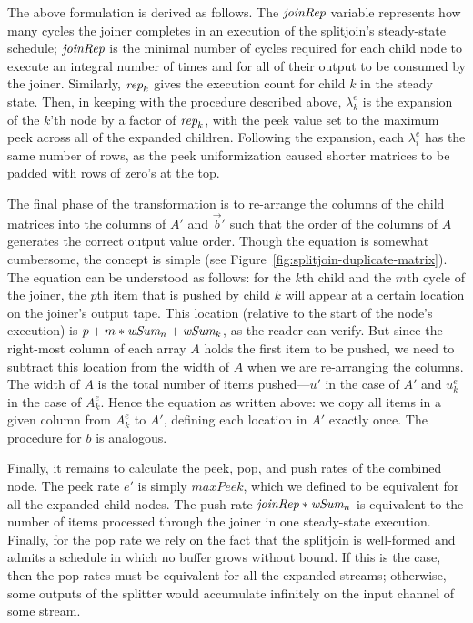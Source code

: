 {The above formulation is derived as follows.  The $\mbox{\it joinRep}$
variable represents how many cycles the joiner completes in an
execution of the splitjoin's steady-state schedule; $\mbox{\it joinRep}$ is
the minimal number of cycles required for each child node to execute
an integral number of times and for all of their output to be consumed
by the joiner.  Similarly, $\mbox{\it rep}_k$ gives the execution count for
child $k$ in the steady state.  Then, in keeping with the procedure
described above, $\lambda_k^e$ is the expansion of the $k$'th node by
a factor of $\mbox{\it rep}_k$, with the peek value set to the maximum peek
across all of the expanded children.  Following the expansion, each
$\lambda_i^e$ has the same number of rows, as the peek uniformization
caused shorter matrices to be padded with rows of zero's at the top.

The final phase of the transformation is to re-arrange the columns of
the child matrices into the columns of $A'$ and $\vec{b}'$ such that
the order of the columns of $A$ generates the correct output value
order.  Though the equation is somewhat cumbersome, the concept is
simple (see Figure~\ref{fig:splitjoin-duplicate-matrix}).  The
equation can be understood as follows: for the $k$th child and the
$m$th cycle of the joiner, the $p$th item that is pushed by child $k$
will appear at a certain location on the joiner's output tape.  This
location (relative to the start of the node's execution) is $p + m *
\mbox{\it wSum}_n + \mbox{\it wSum}_k$, as the reader can verify.  But since the
right-most column of each array $A$ holds the first item to be pushed,
we need to subtract this location from the width of $A$ when we are
re-arranging the columns.  The width of $A$ is the total number of
items pushed---$u'$ in the case of $A'$ and $u_k^e$ in the case of
$A_k^e$.  Hence the equation as written above: we copy all items in a
given column from $A_k^e$ to $A'$, defining each location in $A'$
exactly once.  The procedure for $b$ is analogous.

Finally, it remains to calculate the peek, pop, and push rates of the
combined node.  The peek rate $e'$ is simply $maxPeek$, which we
defined to be equivalent for all the expanded child nodes.  The push
rate $\mbox{\it joinRep}*\mbox{\it wSum}_n$ is equivalent to the number of items
processed through the joiner in one steady-state execution.  Finally,
for the pop rate we rely on the fact that the splitjoin is well-formed
and admits a schedule in which no buffer grows without bound.  If this
is the case, then the pop rates must be equivalent for all the
expanded streams; otherwise, some outputs of the splitter would
accumulate infinitely on the input channel of some stream.  

}

